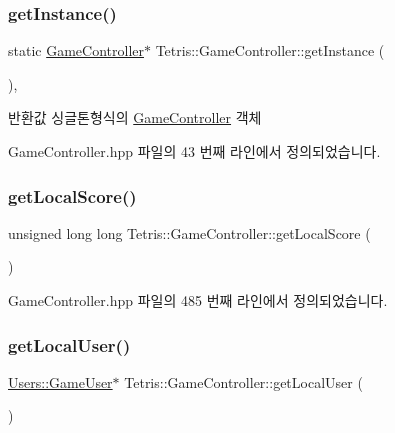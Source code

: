 \subsubsection{\texorpdfstring{get\+Instance()}{getInstance()}\hspace{0.1cm}{\footnotesize\ttfamily [2/2]}}
{\footnotesize\ttfamily static \hyperlink{class_tetris_1_1_game_controller}{Game\+Controller}$\ast$ Tetris\+::\+Game\+Controller\+::get\+Instance (\begin{DoxyParamCaption}{ }\end{DoxyParamCaption})\hspace{0.3cm}{\ttfamily [inline]}, {\ttfamily [static]}}

\begin{DoxyReturn}{반환값}
싱글톤형식의 \hyperlink{class_tetris_1_1_game_controller}{Game\+Controller} 객체 
\end{DoxyReturn}


Game\+Controller.\+hpp 파일의 43 번째 라인에서 정의되었습니다.

\mbox{\label{class_tetris_1_1_game_controller_ad88f3362af23d87282ee8ed39394054d}} 
\subsubsection{\texorpdfstring{get\+Local\+Score()}{getLocalScore()}}
{\footnotesize\ttfamily unsigned long long Tetris\+::\+Game\+Controller\+::get\+Local\+Score (\begin{DoxyParamCaption}{ }\end{DoxyParamCaption})\hspace{0.3cm}{\ttfamily [inline]}}



Game\+Controller.\+hpp 파일의 485 번째 라인에서 정의되었습니다.

\mbox{\label{class_tetris_1_1_game_controller_abc67d4b309ce2886b43a3b4e0af22abc}} 
\subsubsection{\texorpdfstring{get\+Local\+User()}{getLocalUser()}}
{\footnotesize\ttfamily \hyperlink{class_tetris_1_1_users_1_1_game_user}{Users\+::\+Game\+User}$\ast$ Tetris\+::\+Game\+Controller\+::get\+Local\+User (\begin{DoxyParamCaption}{ }\end{DoxyParamCaption})\hspace{0.3cm}{\ttfamily [inline]}}



